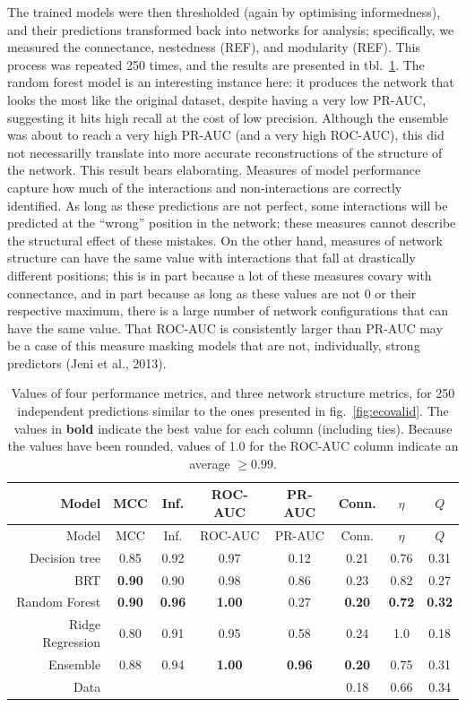 \documentclass[11pt]{article}
\begin{document}
The trained models were then thresholded (again by optimising
informedness), and their predictions transformed back into networks for
analysis; specifically, we measured the connectance, nestedness (REF),
and modularity (REF). This process was repeated 250 times, and the
results are presented in tbl.~\ref{tbl:comparison}. The random forest
model is an interesting instance here: it produces the network that
looks the most like the original dataset, despite having a very low
PR-AUC, suggesting it hits high recall at the cost of low precision.
Although the ensemble was about to reach a very high PR-AUC (and a very
high ROC-AUC), this did not necessarilly translate into more accurate
reconstructions of the structure of the network. This result bears
elaborating. Measures of model performance capture how much of the
interactions and non-interactions are correctly identified. As long as
these predictions are not perfect, some interactions will be predicted
at the ``wrong'' position in the network; these measures cannot describe
the structural effect of these mistakes. On the other hand, measures of
network structure can have the same value with interactions that fall at
drastically different positions; this is in part because a lot of these
measures covary with connectance, and in part because as long as these
values are not 0 or their respective maximum, there is a large number of
network configurations that can have the same value. That ROC-AUC is
consistently larger than PR-AUC may be a case of this measure masking
models that are not, individually, strong predictors (Jeni et al.,
2013).

\hypertarget{tbl:comparison}{}
\begin{longtable}[]{@{}rccccccc@{}}
\caption{\label{tbl:comparison}Values of four performance metrics, and
three network structure metrics, for 250 independent predictions similar
to the ones presented in fig.~\ref{fig:ecovalid}. The values in
\textbf{bold} indicate the best value for each column (including ties).
Because the values have been rounded, values of 1.0 for the ROC-AUC
column indicate an average \(\ge 0.99\).}\tabularnewline
\toprule
Model & MCC & Inf. & ROC-AUC & PR-AUC & Conn. & \(\eta\) &
\(Q\)\tabularnewline
\midrule
\endfirsthead
\toprule
Model & MCC & Inf. & ROC-AUC & PR-AUC & Conn. & \(\eta\) &
\(Q\)\tabularnewline
\midrule
\endhead
Decision tree & 0.85 & 0.92 & 0.97 & 0.12 & 0.21 & 0.76 &
0.31\tabularnewline
BRT & \textbf{0.90} & 0.90 & 0.98 & 0.86 & 0.23 & 0.82 &
0.27\tabularnewline
Random Forest & \textbf{0.90} & \textbf{0.96} & \textbf{1.00} & 0.27 &
\textbf{0.20} & \textbf{0.72} & \textbf{0.32}\tabularnewline
Ridge Regression & 0.80 & 0.91 & 0.95 & 0.58 & 0.24 & 1.0 &
0.18\tabularnewline
Ensemble & 0.88 & 0.94 & \textbf{1.00} & \textbf{0.96} & \textbf{0.20} &
0.75 & 0.31\tabularnewline
Data & & & & & 0.18 & 0.66 & 0.34\tabularnewline
\bottomrule
\end{longtable}
\end{document}

